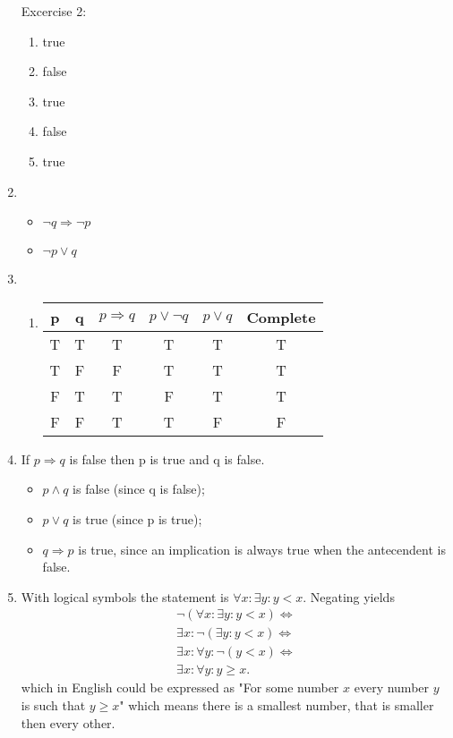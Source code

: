 \documentclass{article}
\begin{document}
\begin{enumerate}
        Excercise 2:
        \begin{enumerate}
            \item true
            \item false
            \item true
            \item false
            \item true
        \end{enumerate}

    \item 
        \begin{itemize}
            \item $\lnot q \Rightarrow \lnot p$
            \item $\lnot p \lor q$
        \end{itemize}

    \item
        \begin{enumerate}
            \item 
                \begin{tabular}{c | c | c | c | c | c}
                    p & q & $ p \Rightarrow q $ & $p \lor \lnot q $ & $ p \lor q $ & Complete \\ \hline
                    T & T & T & T & T & T \\
                    T & F & F & T & T & T \\
                    F & T & T & F & T & T \\
                    F & F & T & T & F & F
                \end{tabular}
        \end{enumerate}
    \item If $p \Rightarrow q $ is false then p is true and q is false.
        \begin{itemize}
            \item $p \land q$ is false (since q is false);
            \item $p \lor q$ is true (since p is true);
            \item $q \Rightarrow p$ is true, since an implication is always true when the antecendent is false.
        \end{itemize}
    \item With logical symbols the statement is $\forall x : \exists y : y < x$. Negating yields 
        \begin{align*}
            \lnot(\forall x : \exists y : y < x) \Leftrightarrow \\
            \exists x : \lnot(\exists y : y < x) \Leftrightarrow \\
            \exists x : \forall y : \lnot (y < x) \Leftrightarrow \\
            \exists x : \forall y : y \geq x.
        \end{align*}
        which in English could be expressed as "For some number $x$ every number $y$ is such that $y \geq x$" which means there is a smallest number, that is smaller then every other.


\end{enumerate}
\end{document}
